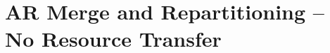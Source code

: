 \section{AR Merge and Repartitioning -- No Resource Transfer}
%


\newcommand{\effect}[1]{\Delta #1}
\newcommand{\mergeLS}[3]{\func{merge_L}{#1, #2, #3}}
\newcommand{\orth}[1]{\ensuremath{{#1}^{\#}}}
\newcommand{\conflict}[3]{\pred{conflict}{#1, #2, #3}}
\newcommand{\FPWorlds}{\sort{FPWorld}}
\newcommand{\fpw}{\ensuremath{\mathbf{w}}}
\newcommand{\fpgs}{\ensuremath{\mathbf{s}}}
\newcommand{\relyU}{\ensuremath{\mathit{R^{u}}}}
\newcommand{\relyE}{\ensuremath{\mathit{R^{e}}}}
\newcommand{\guarU}{\ensuremath{\mathit{G^{u}}}}
\newcommand{\guarE}{\ensuremath{\mathit{G^{e}}}}
\newcommand{\myrely}{\ensuremath{\mathcal R}}
\newcommand{\myguar}{\ensuremath{\mathcal G}}
\newcommand{\mergeW}[2]{\func{merge}{#1, #2}}
\newcommand{\mergeWAux}[3]{\func{merge_W}{#1, #2, #3}}
\newcommand{\mergeR}[1]{\func{merge}{#1}}
\newcommand{\stable}[1]{\pred{stable}{#1}}

\newcommand{\erase}[1]{\ensuremath{\llfloor #1 \rrfloor}}
\newcommand{\lift}[1]{\ensuremath{\llceil #1 \rrceil}}

